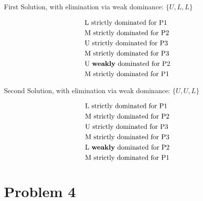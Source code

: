 \documentclass{article}
\begin{document}
First Solution, with elimination via weak dominance: $\{U, L, L\}$

\begin{align*}
& \text{L strictly dominated for P1} \\
& \text{M strictly dominated for P2} \\
& \text{U strictly dominated for P3} \\
& \text{M strictly dominated for P3} \\
& \text{U \textbf{weakly} dominated for P2} \\
& \text{M strictly dominated for P1}
\end{align*}

Second Solution, with elimination via weak dominance: $\{U, U, L\}$

\begin{align*}
& \text{L strictly dominated for P1} \\
& \text{M strictly dominated for P2} \\
& \text{U strictly dominated for P3} \\
& \text{M strictly dominated for P3} \\
& \text{L \textbf{weakly} dominated for P2} \\
& \text{M strictly dominated for P1}
\end{align*}

\section{Problem 4}
\end{document}
